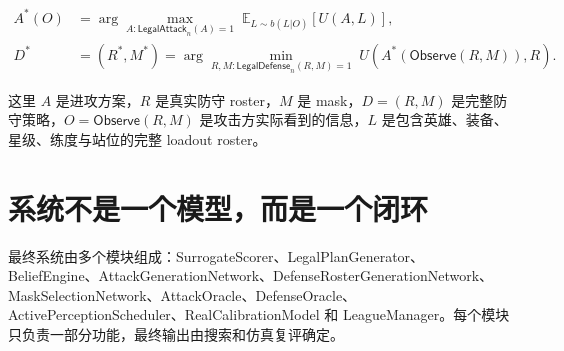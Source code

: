 \documentclass[UTF8,12pt,openany]{ctexbook}
\newcommand{\LegalAttack}{\mathsf{LegalAttack}}
\newcommand{\LegalDefense}{\mathsf{LegalDefense}}
\newcommand{\Observe}{\mathsf{Observe}}
\begin{document}
\begin{align}
A^*(O) &= \arg\max_{A:\LegalAttack_n(A)=1}\; \mathbb{E}_{L\sim b(L|O)}[U(A,L)], \\
D^* &= (R^*,M^*) = \arg\min_{R,M:\LegalDefense_n(R,M)=1}\; U(A^*(\Observe(R,M)),R).
\end{align}

这里 $A$ 是进攻方案，$R$ 是真实防守 roster，$M$ 是 mask，$D=(R,M)$ 是完整防守策略，$O=\Observe(R,M)$ 是攻击方实际看到的信息，$L$ 是包含英雄、装备、星级、练度与站位的完整 loadout roster。

\section{系统不是一个模型，而是一个闭环}
最终系统由多个模块组成：SurrogateScorer、LegalPlanGenerator、BeliefEngine、AttackGenerationNetwork、DefenseRosterGenerationNetwork、MaskSelectionNetwork、AttackOracle、DefenseOracle、ActivePerceptionScheduler、RealCalibrationModel 和 LeagueManager。每个模块只负责一部分功能，最终输出由搜索和仿真复评确定。
\end{document}
